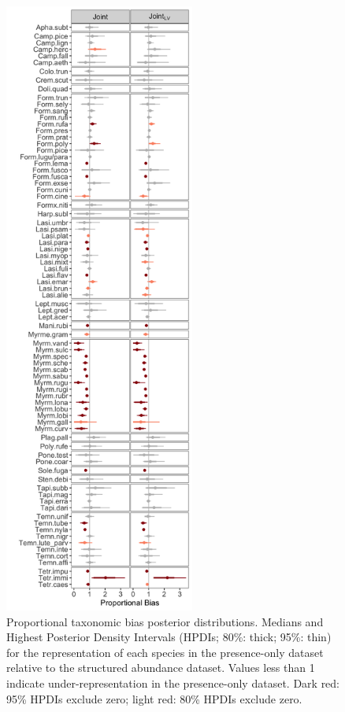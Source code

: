 \documentclass[preprint,review,times,12pt]{elsarticle}
\begin{document}
\begin{figure}
	\centering\includegraphics[height=8in]{ms/1_Ecography/1/figs/D.png}
	\caption{\label{fig:D} Proportional taxonomic bias posterior distributions. Medians and Highest Posterior Density Intervals (HPDIs; 80\%: thick; 95\%: thin) for the representation of each species in the presence-only dataset relative to the structured abundance dataset. Values less than 1 indicate under-representation in the presence-only dataset. Dark red: 95\% HPDIs exclude zero; light red: 80\% HPDIs exclude zero. }
\end{figure}
\end{document}
